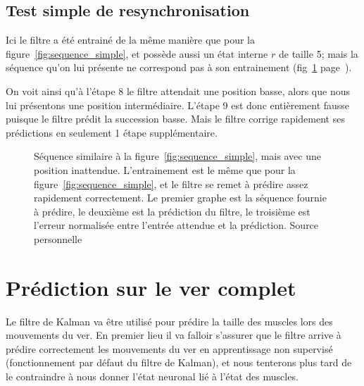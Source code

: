 \subsection{Test simple de resynchronisation} %
\label{sub:Test simple de resynchronisation}

Ici le filtre a été entrainé de la même manière que pour la
figure~\ref{fig:sequence_simple}, et possède aussi un état interne $r$ de
taille 5; mais la séquence qu'on lui présente ne correspond pas à son
entrainement (fig~\ref{fig:sequence_simple_erreur}
page~\pageref{fig:sequence_simple_erreur}).

On voit ainsi qu'à l'étape 8 le filtre attendait une position basse, alors que
nous lui présentons une position intermédiaire. L'étape 9 est donc entièrement
fausse puisque le filtre prédit la succession basse. Mais le filtre corrige
rapidement ses prédictions en seulement 1 étape supplémentaire.

\begin{figure}[ht]
   \begin{center}
   \end{center}
   \caption[Prédiction de séquence simple, avec erreur]{Séquence similaire à la
   figure~\ref{fig:sequence_simple}, mais avec une position inattendue.
   L'entrainement est le même que pour la figure~\ref{fig:sequence_simple}, et
   le filtre se remet à prédire assez rapidement correctement. Le premier graphe
   est la séquence fournie à prédire, le deuxième est la prédiction du filtre,
   le troisième est l'erreur normalisée entre l'entrée attendue et la
   prédiction. Source personnelle}
   \label{fig:sequence_simple_erreur}
\end{figure}



\section{Prédiction sur le ver complet} %
\label{sec:Prédiction sur le ver complet}

Le filtre de Kalman va être utilisé pour prédire la taille des muscles lors des
mouvements du ver. En premier lieu il va falloir s'assurer que le filtre arrive
à prédire correctement les mouvements du ver en apprentissage non supervisé
(fonctionnement par défaut du filtre de Kalman), et nous tenterons plus tard de
le contraindre à nous donner l'état neuronal lié à l'état des muscles.


